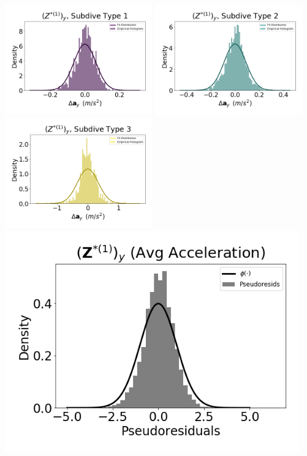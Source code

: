 \documentclass[12pt]{TD-CJS}
\begin{document}
\newpage

\includegraphics[width=2.5in]{../Plots/HHMM_empirical_hist_Ay_0.png}
\includegraphics[width=2.5in]{../Plots/HHMM_empirical_hist_Ay_1.png}
\includegraphics[width=2.5in]{../Plots/HHMM_empirical_hist_Ay_2.png}
\includegraphics[width=5in]{../Plots/HHMM_psedoresids_Ay.png}
\end{document}
